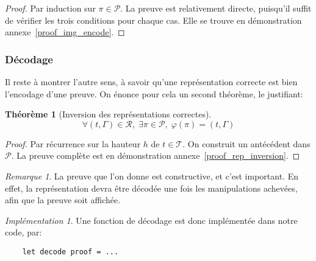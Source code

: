 \documentclass[11pt,a4paper]{article}
\theoremstyle{plain}
\newtheorem{theorem}{Théorème}
\theoremstyle{definition}
\theoremstyle{remark}
\newtheorem{remark}{Remarque}
\newtheorem{implementation}{Implémentation}
\newcommand*{\someproof}{\pi}
\newcommand*{\sequent}{\Gamma}
\newcommand*{\proofs}{\ensuremath{\mathcal{P}}}
\newcommand*{\trees}{\ensuremath{\mathcal{T}}}
\newcommand*{\representations}{\ensuremath{\mathcal{R}}}
\newcommand*{\encode}{\ensuremath{\varphi}}
\newcommand*{\height}{\ensuremath{h}}
\begin{document}
\begin{proof}
    Par induction sur $\someproof \in \proofs$. La preuve est relativement directe, puisqu'il suffit de vérifier les trois conditions pour chaque cas. Elle se trouve en démonstration annexe~\ref{proof_img_encode}.
\end{proof}

\subsubsection{Décodage}
Il reste à montrer l'autre sens, à savoir qu'une représentation correcte est bien l'encodage d'une preuve. On énonce pour cela un second théorème, le justifiant:

\begin{theorem}[Inversion des représentations correctes]
\label{rep_inversion}
\begin{equation*}
\forall (t, \sequent) \in \representations, \; \exists \someproof \in \proofs, \; \encode \left( \someproof \right) = (t, \sequent)
\end{equation*}
\end{theorem}

\begin{proof}
    Par récurrence sur la hauteur $\height$ de $t \in \trees$. On construit un antécédent dans $\proofs$. La preuve complète est en démonstration annexe~\ref{proof_rep_inversion}.
\end{proof}

\begin{remark}
    La preuve que l'on donne est constructive, et c'est important. En effet, la représentation devra être décodée une fois les manipulations achevées, afin que la preuve soit affichée.
\end{remark}

\begin{implementation}
    Une fonction de décodage est donc implémentée dans notre code, par:
    \begin{verbatim}
    let decode proof = ...
    \end{verbatim}
\end{implementation}
\end{document}
